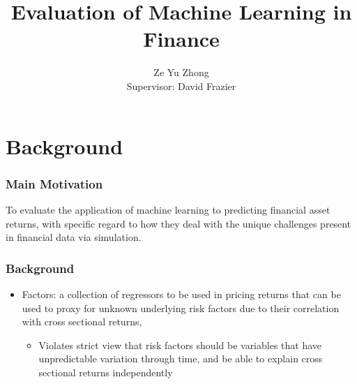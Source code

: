 \documentclass[]{beamer}
\title{Evaluation of Machine Learning in Finance}
\author{
	Ze Yu Zhong \\
	Supervisor: David Frazier
}
\institute{Monash University}
\date{}
\begin{document}
	
\begin{frame}[plain]
    \maketitle
\end{frame}

\section{Background}


\begin{frame}
\frametitle{Main Motivation}
To evaluate the application of machine learning to predicting financial asset returns, with specific regard to how they deal with the unique challenges present in financial data via simulation.
\end{frame}

\begin{frame}
\frametitle{Background}
\begin{itemize}
\item Factors: a collection of regressors to be used in pricing returns that can be used to proxy for unknown underlying risk factors due to their correlation with cross sectional returns, \citep{harvey__2016}

	\begin{itemize}
		\item Violates strict view that risk factors should be variables that have unpredictable variation through time, and be able to explain cross sectional returns independently
	\end{itemize}
\end{itemize}

\end{frame}
\end{document}
